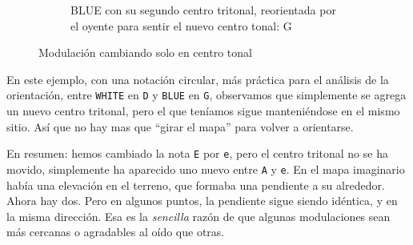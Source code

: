 \documentclass[]{article}
\begin{document}
\begin{figure}[H]
\begin{subfigure}{0.30\textwidth}
  \end{subfigure}
  \hfill
  \begin{subfigure}{0.30\textwidth}
    \centering
    \caption{\textsf{BLUE} con su segundo centro tritonal, reorientada por el oyente para sentir el nuevo centro tonal: \textsf{G}}
    
  \end{subfigure}
  \hfill
  \caption{Modulación cambiando solo en centro tonal}\label{fig:modulation-changing-tonal-center}
  \end{figure}

En este ejemplo, con una notación circular, más práctica para el análisis de la orientación, entre \texttt{WHITE} en \texttt{D} y \texttt{BLUE} en \texttt{G}, observamos que simplemente se agrega un nuevo centro tritonal, pero el que teníamos sigue manteniéndose en el mismo sitio. Así que no hay mas que ``girar el mapa'' para volver a orientarse.

En resumen: hemos cambiado la nota \texttt{E} por \texttt{e}, pero el centro tritonal no se ha movido, simplemente ha aparecido uno nuevo entre \texttt{A} y \texttt{e}. En el mapa imaginario había una elevación en el terreno, que formaba una pendiente a su alrededor. Ahora hay dos. Pero en algunos puntos, la pendiente sigue siendo idéntica, y en la misma dirección. Esa es la \emph{sencilla} razón de que algunas modulaciones sean más cercanas o agradables al oído que otras.
\end{document}
